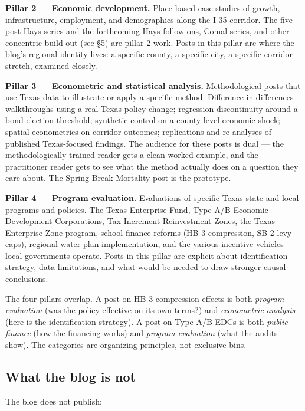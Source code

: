 \documentclass[11pt]{article}
\begin{document}
\textbf{Pillar 2 --- Economic development.} Place-based case
studies of growth, infrastructure, employment, and demographics
along the I-35 corridor. The five-post Hays series and the
forthcoming Hays follow-ons, Comal series, and other concentric
build-out (see \S 5) are pillar-2 work. Posts in this pillar are
where the blog's regional identity lives: a specific county, a
specific city, a specific corridor stretch, examined closely.

\textbf{Pillar 3 --- Econometric and statistical analysis.}
Methodological posts that use Texas data to illustrate or apply
a specific method. Difference-in-differences walkthroughs using
a real Texas policy change; regression discontinuity around a
bond-election threshold; synthetic control on a county-level
economic shock; spatial econometrics on corridor outcomes;
replications and re-analyses of published Texas-focused findings.
The audience for these posts is dual --- the methodologically
trained reader gets a clean worked example, and the
practitioner reader gets to see what the method actually does
on a question they care about. The Spring Break Mortality post
is the prototype.

\textbf{Pillar 4 --- Program evaluation.} Evaluations of specific
Texas state and local programs and policies. The Texas Enterprise
Fund, Type A/B Economic Development Corporations, Tax Increment
Reinvestment Zones, the Texas Enterprise Zone program, school
finance reforms (HB 3 compression, SB 2 levy caps), regional
water-plan implementation, and the various incentive vehicles
local governments operate. Posts in this pillar are explicit
about identification strategy, data limitations, and what would
be needed to draw stronger causal conclusions.

The four pillars overlap. A post on HB 3 compression effects is
both \emph{program evaluation} (was the policy effective on its
own terms?) and \emph{econometric analysis} (here is the
identification strategy). A post on Type A/B EDCs is both
\emph{public finance} (how the financing works) and
\emph{program evaluation} (what the audits show). The categories
are organizing principles, not exclusive bins.

\subsection{What the blog is not}

The blog does not publish:
\end{document}
